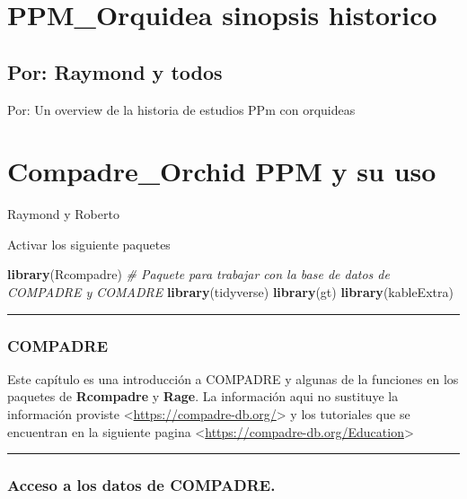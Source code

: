 \documentclass[
]{book}
\newenvironment{Shaded}{\begin{snugshade}}{\end{snugshade}}
\newcommand{\CommentTok}[1]{\textcolor[rgb]{0.56,0.35,0.01}{\textit{#1}}}
\newcommand{\FunctionTok}[1]{\textcolor[rgb]{0.13,0.29,0.53}{\textbf{#1}}}
\newcommand{\NormalTok}[1]{#1}
\theoremstyle{definition}
\theoremstyle{definition}
\theoremstyle{definition}
\theoremstyle{definition}
\theoremstyle{remark}
\begin{document}
\chapter{PPM\_Orquidea sinopsis historico}\label{ppm_orquidea-sinopsis-historico}

\section{Por: Raymond y todos}\label{por-raymond-y-todos}

Por: Un overview de la historia de estudios PPm con orquideas

\chapter{Compadre\_Orchid PPM y su uso}\label{compadre_orchid-ppm-y-su-uso}

Raymond y Roberto

Activar los siguiente paquetes

\begin{Shaded}
\begin{Highlighting}[]
\FunctionTok{library}\NormalTok{(Rcompadre) }\CommentTok{\# Paquete para trabajar con la base de datos de COMPADRE y COMADRE}
\FunctionTok{library}\NormalTok{(tidyverse)}
\FunctionTok{library}\NormalTok{(gt)}
\FunctionTok{library}\NormalTok{(kableExtra)}
\end{Highlighting}
\end{Shaded}

\begin{center}\rule{0.5\linewidth}{0.5pt}\end{center}

\subsection{COMPADRE}\label{compadre}

Este capítulo es una introducción a COMPADRE y algunas de la funciones en los paquetes de \textbf{Rcompadre} y \textbf{Rage}. La información aqui no sustituye la información proviste \textless{}\url{https://compadre-db.org/}\textgreater{} y los tutoriales que se encuentran en la siguiente pagina \textless{}\url{https://compadre-db.org/Education}\textgreater{}

\begin{center}\rule{0.5\linewidth}{0.5pt}\end{center}

\subsection{Acceso a los datos de COMPADRE.}\label{acceso-a-los-datos-de-compadre.}
\end{document}
